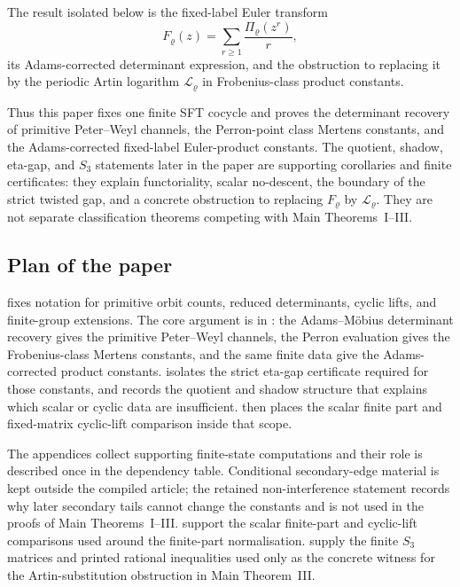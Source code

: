 \documentclass[11pt,a4paper]{amsart}
\theoremstyle{plain}
\theoremstyle{definition}
\theoremstyle{remark}
\begin{document}
The result isolated below is the fixed-label Euler transform
\[
  F_\varrho(z)=\sum_{r\ge1}\frac{\Pi_\varrho(z^r)}{r},
\]
its Adams-corrected determinant expression, and the obstruction to
replacing it by the periodic Artin logarithm
\(\mathcal L_\varrho\) in Frobenius-class product constants.

Thus this paper fixes one finite SFT cocycle and proves the determinant
recovery of primitive Peter--Weyl channels, the Perron-point class Mertens
constants, and the Adams-corrected fixed-label Euler-product constants.  The
quotient, shadow, eta-gap, and \(S_3\) statements later in the paper are
supporting corollaries and finite certificates: they explain functoriality,
scalar no-descent, the boundary of the strict twisted gap, and a concrete
obstruction to replacing \(F_\varrho\) by \(\mathcal L_\varrho\).  They are
not separate classification theorems competing with Main Theorems~I--III.
\subsection{Plan of the paper}

 fixes notation for primitive orbit counts,
reduced determinants, cyclic lifts, and finite-group extensions.  The core
argument is in : the Adams--M\"obius determinant
recovery gives the primitive Peter--Weyl channels, the Perron evaluation
gives the Frobenius-class Mertens constants, and the same finite data give
the Adams-corrected product constants.   isolates the
strict eta-gap certificate required for those constants, and
 records the quotient and shadow structure that explains
which scalar or cyclic data are insufficient.  
then places the scalar finite part and fixed-matrix cyclic-lift comparison
inside that scope.

The appendices collect supporting finite-state computations and their role is
described once in the dependency table.  Conditional secondary-edge material is
kept outside the compiled article; the retained non-interference statement
 records why later secondary
tails cannot change the constants and is not used in the proofs of Main
Theorems~I--III.
support the scalar finite-part and cyclic-lift comparisons used around the
finite-part normalisation.   supply the finite \(S_3\) matrices and printed
rational inequalities used only as the concrete witness for the
Artin-substitution obstruction in Main Theorem~III.
\end{document}
